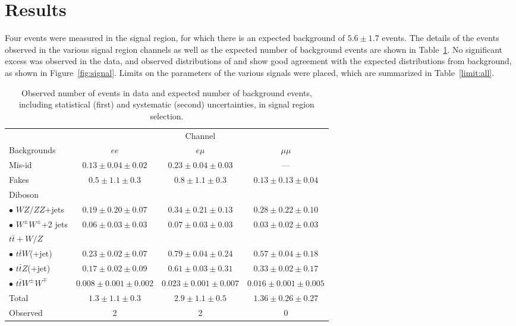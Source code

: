 \section{Results}\label{sect:results}
Four events were measured in the signal region, for which there is an expected background of $5.6\pm1.7$ events.
The details of the events observed in the various signal region channels as well as the expected number of background events are shown in Table~\ref{finalyield}.
No significant excess was observed in the data, and observed distributions of \met{} and \HT{} show good agreement with the expected distributions from background,
as shown in Figure~\ref{fig:signal}.
Limits on the parameters of the various signals were placed, which are summarized in Table~\ref{limit:all}.

\begin{table}[t]
  \footnotesize
  \begin{center}
    \begin{tabular}{l|c|c|c}
      \hline
      & \multicolumn{3}{c}{Channel} \\
      \cline{2-4}
      Backgrounds & $ee$ & $e\mu$ & $\mu\mu$ \\
      \hline
      Mis-id & $0.13\pm 0.04 \pm 0.02$ & $0.23\pm 0.04 \pm 0.03$ & --- \\
      Fakes & $0.5\pm 1.1 \pm 0.3$ & $0.8\pm 1.1 \pm 0.3$ & $0.13\pm 0.13\pm 0.04$ \\
      \hline
      Diboson & & & \\
      $\bullet$ $WZ/ZZ$+jets & $0.19\pm 0.20 \pm 0.07$ & $0.34\pm 0.21\pm 0.13$ & $0.28\pm 0.22\pm 0.10$ \\
      $\bullet$ $W^{\pm}W^\pm$+2 jets & $0.06\pm 0.03\pm 0.03$ & $0.07\pm 0.03\pm 0.03$ & $0.03\pm 0.02\pm 0.03$ \\
      \hline
      $t\bar{t}+W/Z$ & & & \\
      $\bullet$ $t\bar{t}W$(+jet) & $0.23\pm 0.02\pm 0.07$ & $0.79\pm 0.04\pm 0.24$ & $0.57\pm 0.04\pm 0.18$ \\
      $\bullet$ $t\bar{t}Z$(+jet) & $0.17\pm 0.02\pm 0.09$ & $0.61\pm 0.03\pm 0.31$ & $0.33\pm 0.02\pm 0.17$ \\
      $\bullet$ $t\bar{t}W^{\pm}W^\mp$ & $0.008\pm 0.001\pm 0.002$ & $0.023\pm 0.001\pm 0.007$ & $0.016\pm 0.001\pm 0.005$ \\
      \hline
      Total & $1.3 \pm 1.1 \pm 0.3$ & $2.9 \pm 1.1 \pm 0.5$ & $1.36 \pm 0.26 \pm 0.27$ \\
      \hline
      Observed & 2 & 2 & 0 \\
      \hline
    \end{tabular}
    \caption{Observed number of events in data and expected number of background events, including statistical (first) and systematic (second) uncertainties, in signal region selection.}\label{finalyield}
  \end{center}
\end{table}
\clearpage
\newpage


